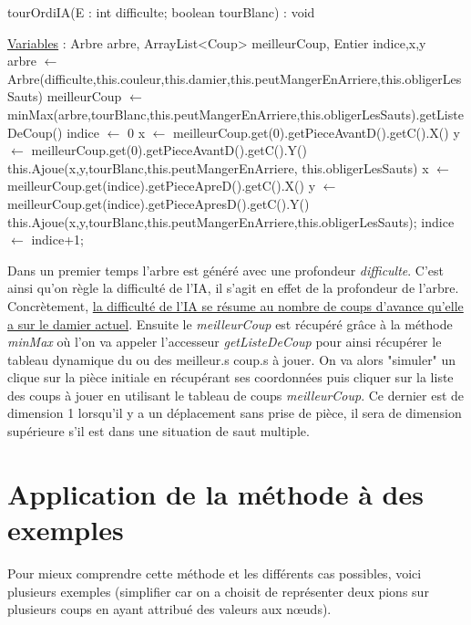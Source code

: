 \documentclass[12,french]{report}
\begin{document}
\begin{algorithm}
	\caption{tourOrdiIA(E : int difficulte; boolean tourBlanc) : void}
	\begin{algorithmic}
	\State \underline{Variables} : Arbre arbre, ArrayList<Coup> meilleurCoup, Entier indice,x,y\\
	\State arbre $\leftarrow$ Arbre(difficulte,this.couleur,this.damier,this.peutMangerEnArriere,this.obligerLesSauts)
	\State meilleurCoup $\leftarrow$ minMax(arbre,tourBlanc,this.peutMangerEnArriere,this.obligerLesSauts).getListeDeCoup()
	\State indice $\leftarrow$ 0
	\State x $\leftarrow$ meilleurCoup.get(0).getPieceAvantD().getC().X()
	\State y $\leftarrow$ meilleurCoup.get(0).getPieceAvantD().getC().Y()
	\State this.Ajoue(x,y,tourBlanc,this.peutMangerEnArriere, this.obligerLesSauts)
	\State x $\leftarrow$ meilleurCoup.get(indice).getPieceApreD().getC().X()
	\State y $\leftarrow$ meilleurCoup.get(indice).getPieceApresD().getC().Y()
	\State this.Ajoue(x,y,tourBlanc,this.peutMangerEnArriere,this.obligerLesSauts);
	\State indice $\leftarrow$ indice+1;
	\EndWhile
	\end{algorithmic}
\end{algorithm}\vspace{0.4cm}

Dans un premier temps l'arbre est généré avec une profondeur \textit{difficulte}. C'est ainsi qu'on règle la difficulté de l'IA, il s'agit en effet de la profondeur de l'arbre. Concrètement, \uline{la difficulté de l'IA se résume au nombre de coups d'avance qu'elle a sur le damier actuel}. Ensuite le \textit{meilleurCoup} est récupéré grâce à la méthode \textit{minMax} où l'on va appeler l'accesseur \textit{getListeDeCoup} pour ainsi récupérer le tableau dynamique du ou des meilleur.s coup.s à jouer. On va alors "simuler" un clique sur la pièce initiale en récupérant ses coordonnées puis cliquer sur la liste des coups à jouer en utilisant le tableau de coups \textit{meilleurCoup}. Ce dernier est de dimension 1 lorsqu'il y a un déplacement sans prise de pièce, il sera de dimension supérieure s'il est dans une situation de saut multiple.

\section{Application de la méthode à des exemples}

Pour mieux comprendre cette méthode et les différents cas possibles,
voici plusieurs exemples (simplifier car on a choisit de représenter
deux pions sur plusieurs coups en ayant attribué des valeurs aux nœuds).
\end{document}
